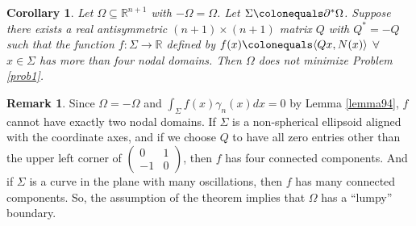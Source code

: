 \documentclass[12pt,reqno]{amsart}
\newtheorem{cor}[theorem]{Corollary}
\theoremstyle{definition}
\newtheorem{remark}[theorem]{Remark}
\renewcommand{\subset}{\subseteq}
\newcommand{\R}{\mathbb{R}}
\newcommand{\redA}{\partial^{*}\Omega}
\newcommand{\sdimn}{n}
\newcommand{\adimn}{n+1}
\begin{document}
\begin{cor}\label{cor11}
Let $\Omega\subset\R^{\adimn}$ with $-\Omega=\Omega$.  Let $\Sigma\colonequals\redA$.  Suppose there exists a real antisymmetric $(\adimn)\times(\adimn)$ matrix $Q$ with $Q^{*}=-Q$ such that the function $f\colon\Sigma\to\R$ defined by $f(x)\colonequals\langle Qx,N(x)\rangle$ $\forall$ $x\in\Sigma$ has more than four nodal domains.  Then $\Omega$ does not minimize Problem \ref{prob1}.
\end{cor}
\begin{remark}
Since $\Omega=-\Omega$ and $\int_{\Sigma}f(x)\gamma_{\sdimn}(x)dx=0$ by Lemma \ref{lemma94}, $f$ cannot have exactly two nodal domains.  If $\Sigma$ is a non-spherical ellipsoid aligned with the coordinate axes, and if we choose $Q$ to have all zero entries other than the upper left corner of $\begin{pmatrix} 0 & 1\\ -1 & 0\end{pmatrix}$, then $f$ has four connected components.  And if $\Sigma$ is a curve in the plane with many oscillations, then $f$ has many connected components.  So, the assumption of the theorem implies that $\Omega$ has a ``lumpy'' boundary.
\end{remark}
\end{document}
